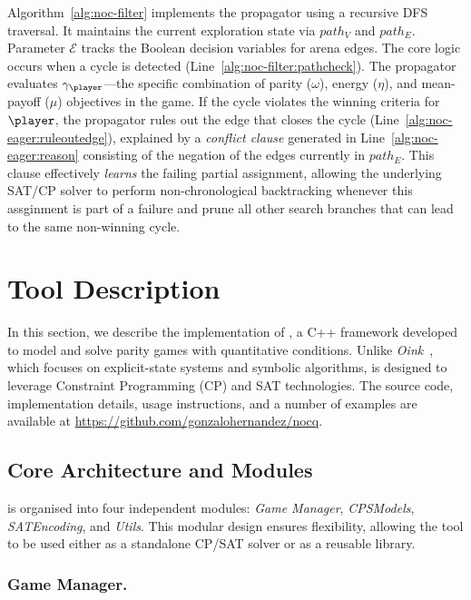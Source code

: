 \documentclass[runningheads]{llncs}
\begin{document}
Algorithm~\ref{alg:noc-filter} implements the \noc propagator using a recursive DFS traversal. It maintains the current exploration state via $path_V$ and $path_E$. Parameter $\mathcal{E}$ tracks the Boolean decision variables for arena edges. The core logic occurs when a cycle is detected (Line~\ref{alg:noc-filter:pathcheck}). The propagator evaluates $\gamma_{\player}$---the specific combination of parity ($\omega$), energy ($\eta$), and mean-payoff ($\mu$) objectives in the game. 
%
If the cycle violates the winning criteria for $\player$, the propagator rules out the edge that closes the cycle (Line~\ref{alg:noc-eager:ruleoutedge}), explained by a \textit{conflict clause} generated in Line~\ref{alg:noc-eager:reason} consisting of the negation of the edges currently in $path_E$. This clause effectively {\em learns} the failing partial assignment, allowing the underlying SAT/CP solver to perform non-chronological backtracking whenever this assginment is part of a failure and prune all other search branches that can lead to the same non-winning cycle.

\section{Tool Description}

In this section, we describe the implementation of \nocq, a C++ framework developed to model and solve parity games with quantitative conditions. Unlike \emph{Oink}~\cite{vanDijk:2018}, which focuses on explicit-state systems and symbolic algorithms, \nocq is designed to leverage Constraint Programming (CP) and SAT technologies. The source code, implementation details, usage instructions, and a number of examples are available at \url{https://github.com/gonzalohernandez/nocq}.

\subsection*{Core Architecture and Modules}

\nocq is organised into four independent modules: \emph{Game Manager}, \emph{CPSModels}, \emph{SATEncoding}, and \emph{Utils}. This modular design ensures flexibility, allowing the tool to be used either as a standalone CP/SAT solver or as a reusable library.


\subsubsection*{Game Manager.}
\end{document}
